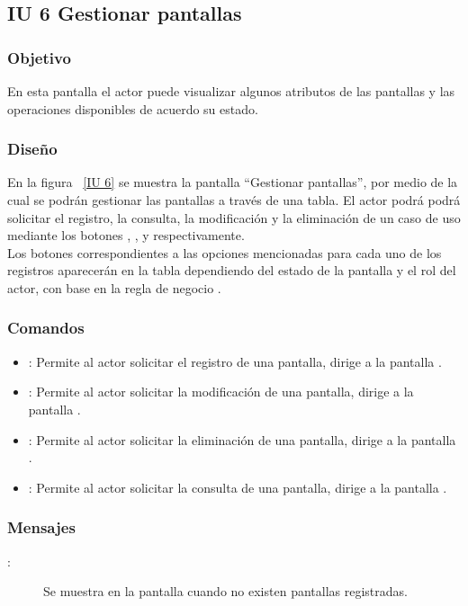 \subsection{IU 6 Gestionar pantallas}
\subsubsection{Objetivo}
	
	En esta pantalla el actor puede visualizar algunos atributos de las pantallas y las operaciones disponibles de acuerdo su estado.

\subsubsection{Diseño}

    En la figura ~\ref{IU 6} se muestra la pantalla ``Gestionar pantallas'', por medio de la cual 
    se podrán gestionar las pantallas a través de una tabla.
    El actor podrá podrá solicitar el registro, la consulta, la modificación y la eliminación de un caso de uso mediante los botones
    , \btnConsulta, \btnEditar y \btnEliminar respectivamente. \\
    
    Los botones correspondientes a las opciones mencionadas para cada uno de los registros aparecerán en la tabla dependiendo del estado
    de la pantalla y el rol del actor, con base en la regla de negocio .




\subsubsection{Comandos}
\begin{itemize}
	\item {}: Permite al actor solicitar el registro de una pantalla, dirige a la pantalla .
	\item \btnEditar[Modificar]: Permite al actor solicitar la modificación de una pantalla, dirige a la pantalla .
	\item \btnEliminar[Eliminar]: Permite al actor solicitar la eliminación de una pantalla, dirige a la pantalla .
	\item \btnConsulta[Consultar]: Permite al actor solicitar la consulta de una pantalla, dirige a la pantalla .
\end{itemize}

\subsubsection{Mensajes}

	
\begin{description}
	\item[:] Se muestra en la pantalla  cuando no existen pantallas registradas.
\end{description}
